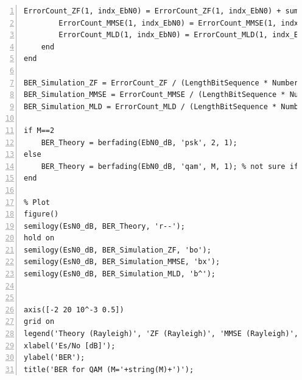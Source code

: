 \documentclass{article}
\begin{document}
\begin{lstlisting}[style=Matlab-editor, frame=single, numbers=left,]
        ErrorCount_ZF(1, indx_EbN0) = ErrorCount_ZF(1, indx_EbN0) + sum(DetectionBitSequence_ZF~=BitSequence);
        ErrorCount_MMSE(1, indx_EbN0) = ErrorCount_MMSE(1, indx_EbN0) + sum(DetectionBitSequence_MMSE~=BitSequence);
        ErrorCount_MLD(1, indx_EbN0) = ErrorCount_MLD(1, indx_EbN0) + sum(DetectionBitSequence_MLD~=BitSequence);
    end
end

BER_Simulation_ZF = ErrorCount_ZF / (LengthBitSequence * NumberIteration);
BER_Simulation_MMSE = ErrorCount_MMSE / (LengthBitSequence * NumberIteration);
BER_Simulation_MLD = ErrorCount_MLD / (LengthBitSequence * NumberIteration);

if M==2
    BER_Theory = berfading(EbN0_dB, 'psk', 2, 1);
else
    BER_Theory = berfading(EbN0_dB, 'qam', M, 1); % not sure if 'dataenc' needs to be specified; I don't even know what it does
end

% Plot
figure()
semilogy(EsN0_dB, BER_Theory, 'r--');
hold on
semilogy(EsN0_dB, BER_Simulation_ZF, 'bo');
semilogy(EsN0_dB, BER_Simulation_MMSE, 'bx');
semilogy(EsN0_dB, BER_Simulation_MLD, 'b^');


axis([-2 20 10^-3 0.5])
grid on
legend('Theory (Rayleigh)', 'ZF (Rayleigh)', 'MMSE (Rayleigh)', 'MLD (Rayleigh)');
xlabel('Es/No [dB]');
ylabel('BER');
title('BER for QAM (M='+string(M)+')');
\end{lstlisting}
\end{document}
